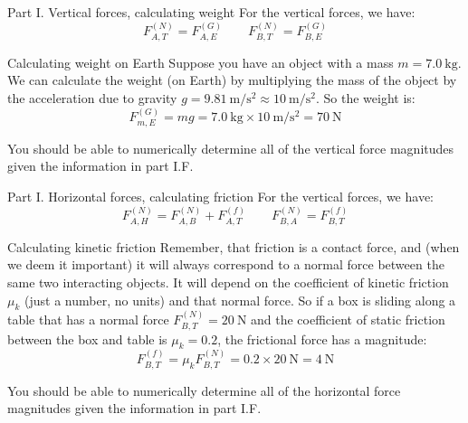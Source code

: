 \documentclass{beamer}
\begin{document}
\begin{frame}
  {Part \textrm{I}. Vertical forces, calculating weight}
  For the vertical forces, we have:
  \[
    F^{(N)}_{A,T} = F^{(G)}_{A,E} \qquad F^{(N)}_{B,T} = F^{(G)}_{B,E}
  \]
  \begin{exampleblock}
    {Calculating weight on Earth}
    Suppose you have an object with a mass $m=\SI{7.0}{\kilo\gram}$. We can calculate the
    weight (on Earth) by multiplying the mass of the object by the acceleration due to gravity
    $g = \SI{9.81}{\meter\per\second^2}\approx\SI{10}{\meter\per\second^2}$. So the weight is:
    \[
      F^{(G)}_{m,E} = mg = \SI{7.0}{\kilo\gram}\times\SI{10}{\meter\per\second^2} = \SI{70}{\newton}
    \]
  \end{exampleblock}
  You should be able to numerically determine all of the vertical force magnitudes given the
  information in part \textrm{I}.F.
\end{frame}

\begin{frame}
  {Part \textrm{I}. Horizontal forces, calculating friction}
  For the vertical forces, we have:
  \[
    F^{(N)}_{A,H} = F^{(N)}_{A,B} + F^{(f)}_{A,T} \qquad F^{(N)}_{B,A} = F^{(f)}_{B,T}
  \]
  \begin{exampleblock}
    {Calculating kinetic friction}
    Remember, that friction is a contact force, and (when we deem it important) it will always
    correspond to a normal force between the same two interacting objects. It will depend on
    the coefficient of kinetic friction $\mu_k$ (just a number, no units) and that normal
    force. So if a box is sliding along a table that has a normal force $F^{(N)}_{B,T}
    =\SI{20}{\newton}$ and the coefficient of static friction between the box and table is
    $\mu_k = 0.2$, the frictional force has a magnitude:
    \[
      F^{(f)}_{B,T} = \mu_kF^{(N)}_{B,T} = 0.2\times \SI{20}{\newton} = \SI{4}{\newton}
    \]
  \end{exampleblock}
  You should be able to numerically determine all of the horizontal force magnitudes given the
  information in part \textrm{I}.F.
\end{frame}
\end{document}
